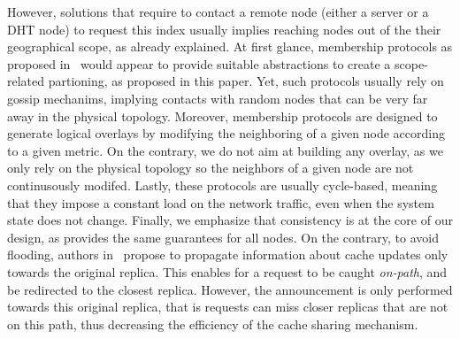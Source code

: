 However, solutions that require to contact a remote node (either a server or a DHT node) to request this index usually implies reaching nodes out of the their geographical scope, as already explained.
At first glance, membership protocols as proposed in~\cite{t-man} would appear to provide suitable abstractions to create a scope-related partioning, as proposed in this paper. Yet, such protocols usually rely on gossip mechanims, implying contacts with random nodes that can be very far away in the physical topology. Moreover, membership protocols are designed to generate logical overlays by modifying the neighboring of a given node according to a given metric. 
On the contrary, we do not aim at building any overlay, as we only rely on the physical topology so the neighbors of a given node are not continusously modifed. Lastly, these protocols are usually cycle-based, meaning that they impose a constant load on the network traffic, even when the system state does not change.
Finally, we emphasize that consistency is at the core of our design, as \NAME provides the same guarantees for all nodes.
On the contrary, to avoid flooding, authors in~\cite{opnl} propose to propagate information about cache updates only towards the original replica. This enables for a request to be caught \textit{on-path}, and be redirected to the closest replica. However, the announcement is only performed towards this original replica, that is requests can miss closer replicas that are not on this path, thus decreasing the efficiency of the cache sharing mechanism. 



% 
% 
% 

